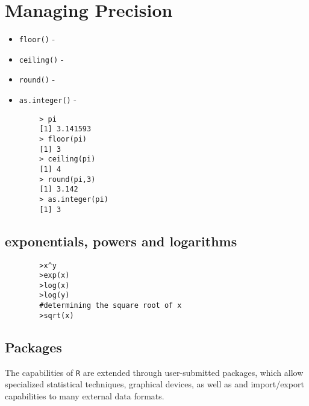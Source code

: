 \documentclass[a4paper,12pt]{article}
\begin{document}
	
	\newpage
	\section{Managing Precision}
	\begin{itemize}
		\item \texttt{floor()} - 
		\item \texttt{ceiling()} - 
		\item \texttt{round()} - 
		\item \texttt{as.integer()} -
	\end{itemize}
	
	\begin{framed}
		\begin{verbatim}
		> pi
		[1] 3.141593
		> floor(pi)
		[1] 3
		> ceiling(pi)
		[1] 4
		> round(pi,3)
		[1] 3.142
		> as.integer(pi)
		[1] 3
		\end{verbatim}
	\end{framed}
	
\subsection{exponentials, powers and logarithms}
	\large
	\begin{framed}
		\begin{verbatim}
		>x^y
		>exp(x)
		>log(x)
		>log(y)
		#determining the square root of x
		>sqrt(x)
		\end{verbatim}
	\end{framed}
	
	
	\subsection{Packages}
	The capabilities of \texttt{R} are extended through user-submitted packages, which allow specialized statistical techniques, graphical devices, as well as and
	import/export capabilities to many external data formats.
	
	
	
	\large
\end{document}
